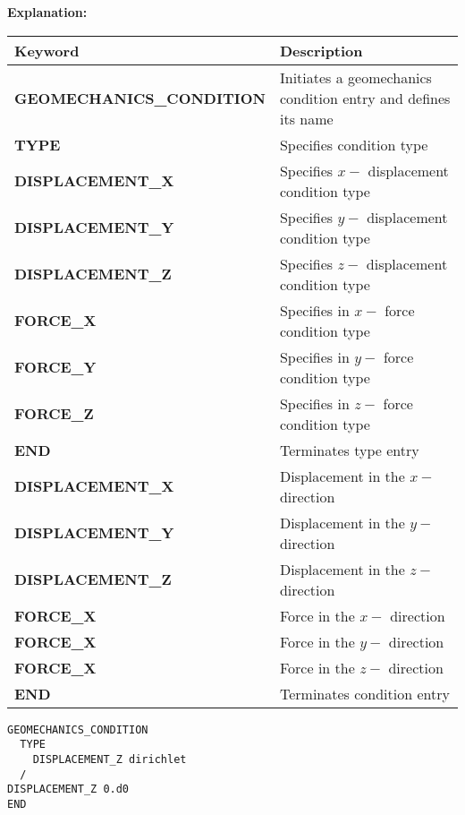 {\noindent\bf Explanation:}

\begin{center}
\begin{tabularx}{\linewidth}{lX}
\toprule[1.5pt]
\bf Keyword & \bf Description\\
\midrule
\bf GEOMECHANICS\_CONDITION & Initiates a geomechanics condition entry and defines its name\\
\midrule
\bf TYPE & Specifies condition type\\
\midrule
    \bf DISPLACEMENT\_X & Specifies $x-$ displacement condition type\\
    \bf DISPLACEMENT\_Y & Specifies $y-$ displacement condition type\\
    \bf DISPLACEMENT\_Z & Specifies $z-$ displacement condition type\\
    \bf FORCE\_X & Specifies in $x-$ force condition type\\
    \bf FORCE\_Y & Specifies in $y-$ force condition type\\
    \bf FORCE\_Z & Specifies in $z-$ force condition type\\
    \bf END & Terminates type entry\\
\toprule[1.5pt]
\bf DISPLACEMENT\_X & Displacement in the $x-$ direction \\ 
\bf DISPLACEMENT\_Y & Displacement in the $y-$ direction \\ 
\bf DISPLACEMENT\_Z & Displacement in the $z-$ direction \\ 
\bf FORCE\_X & Force in the $x-$ direction \\ 
\bf FORCE\_X & Force in the $y-$ direction \\ 
\bf FORCE\_X & Force in the $z-$ direction \\ 
\bf END & Terminates condition entry\\
\bottomrule[1.5pt]
\end{tabularx}
\end{center}


\begin{mdframed}


\begin{verbatim}
GEOMECHANICS_CONDITION
  TYPE
    DISPLACEMENT_Z dirichlet
  /
DISPLACEMENT_Z 0.d0
END

\end{verbatim}
\end{mdframed}

\hyperlink{target_key}{\return}


